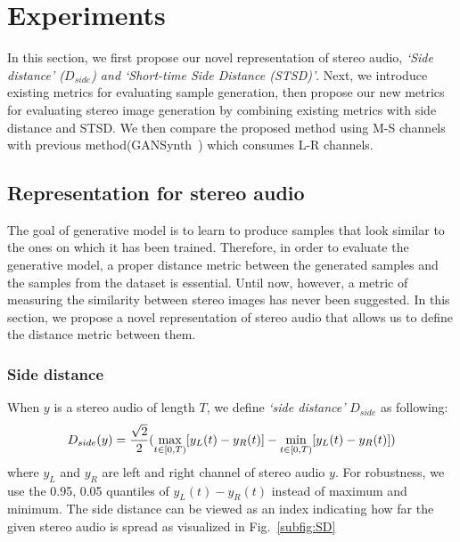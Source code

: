 \section{Experiments}
\label{sec:experiment}

In this section, we first propose our novel representation of stereo audio, \textit{`Side distance' ($D_{side}$) and `Short-time Side Distance (STSD)'}. Next, we introduce existing metrics for evaluating sample generation, then propose our new metrics for evaluating stereo image generation by combining existing metrics with side distance and STSD. We then compare the proposed method using M-S channels with previous method(GANSynth~\cite{gansynth}) which consumes L-R channels.

\subsection{Representation for stereo audio}
\label{subsec:representation}
The goal of generative model is to learn to produce samples that look similar to the ones on which it has been trained. Therefore, in order to evaluate the generative model, a proper distance metric between the generated samples and the samples from the dataset is essential. Until now, however, a metric of measuring the similarity between stereo images has never been suggested. In this section, we propose a novel representation of stereo audio that allows us to define the distance metric between them.

\subsubsection{Side distance}
\label{subsubsec:side_distance}

When $y$ is a stereo audio of length $T$, we define \textit{`side distance'} $D_{side}$ as following:
\begin{equation}
    D_{side}(y) = {\sqrt{2} \over 2}(\max_{t \in [0, T)} [y_L(t) - y_R(t)] - \min_{t \in [0, T)} [y_L(t) - y_R(t)])
\end{equation}
where $y_L$ and $y_R$ are left and right channel of stereo audio $y$. For robustness, we use the 0.95, 0.05 quantiles of $y_L(t) - y_R(t)$ instead of maximum and minimum. The side distance can be viewed as an index indicating how far the given stereo audio is spread as visualized in Fig.~\ref{subfig:SD}

